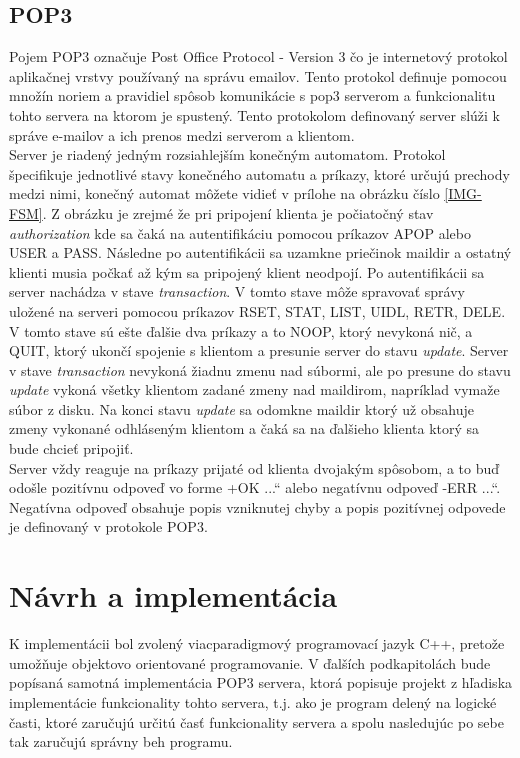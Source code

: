 \documentclass[11pt,a4paper]{article}
\providecommand{\uv}[1]{\quotedblbase #1\textquotedblleft}
\begin{document}
	\subsection{POP3}
		\label{fig:pop3}
		\indent Pojem POP3 označuje Post Office Protocol - Version 3\cite{POP3} čo je internetový protokol aplikačnej vrstvy používaný na správu emailov. Tento protokol definuje pomocou množín noriem a pravidiel spôsob komunikácie s pop3 serverom a funkcionalitu tohto servera na ktorom je spustený. Tento protokolom definovaný server slúži k správe e-mailov a ich prenos medzi serverom a klientom.\\[0.4em]
		Server je riadený jedným rozsiahlejším konečným automatom. Protokol špecifikuje jednotlivé stavy konečného automatu a príkazy, ktoré určujú prechody medzi nimi, konečný automat môžete vidieť v prílohe na obrázku číslo \ref{IMG-FSM}. Z obrázku je zrejmé že pri pripojení klienta je počiatočný stav \textit{authorization} kde sa čaká na autentifikáciu pomocou príkazov APOP alebo USER a PASS. Následne po autentifikácii sa uzamkne priečinok maildir a ostatný klienti musia počkať až kým sa pripojený klient neodpojí. Po autentifikácii sa server nachádza v stave \textit{transaction}. V tomto stave môže spravovať správy uložené na serveri pomocou príkazov RSET, STAT, LIST, UIDL, RETR, DELE. V tomto stave sú ešte ďalšie dva príkazy a to NOOP, ktorý nevykoná nič, a QUIT, ktorý ukončí spojenie s klientom a presunie server do stavu \textit{update}. Server v stave \textit{transaction} nevykoná žiadnu zmenu nad súbormi, ale po presune do stavu \textit{update} vykoná všetky klientom zadané zmeny nad maildirom, napríklad vymaže súbor z disku. Na konci stavu \textit{update} sa odomkne maildir ktorý už obsahuje zmeny vykonané odhláseným klientom a čaká sa na ďalšieho klienta ktorý sa bude chcieť pripojiť.\\[0.4em]
		Server vždy reaguje na príkazy prijaté od klienta dvojakým spôsobom, a to buď odošle pozitívnu odpoveď vo forme \uv{+OK ...} alebo negatívnu odpoveď \uv{-ERR ...}. Negatívna odpoveď obsahuje popis vzniknutej chyby a popis pozitívnej odpovede je definovaný v protokole POP3\cite{POP3}.


\section{Návrh a implementácia}

	\indent K implementácii bol zvolený viacparadigmový programovací jazyk C++, pretože umožňuje objektovo orientované programovanie. V ďalších podkapitolách bude popísaná samotná implementácia POP3 servera, ktorá popisuje projekt z hľadiska implementácie funkcionality tohto servera, t.j. ako je program delený na logické časti, ktoré zaručujú určitú časť funkcionality servera a spolu nasledujúc po sebe tak zaručujú správny beh programu.
\end{document}
